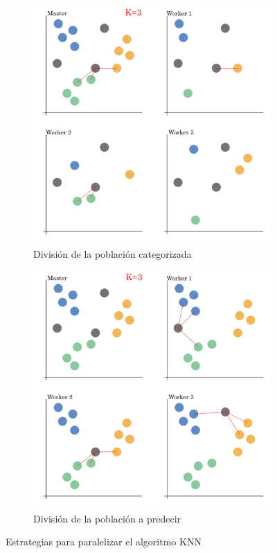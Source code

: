 		\begin{figure}[!h]
			\centering
			
			
			\begin{subfigure}[t]{0.45\textwidth}
				\centering
				\includegraphics[width=\textwidth]{images/chapter_3/knn_mpi1}
				\caption{División de la población categorizada}
				\label{fig:knn1}
			\end{subfigure}
			\hfill
			\begin{subfigure}[t]{0.45\textwidth}
				\centering
				\includegraphics[width=\textwidth]{images/chapter_3/knn_mpi2}
				\caption{División de la población a predecir}
				\label{fig:knn2}
			\end{subfigure}
			
			\caption{Estrategias para paralelizar el algoritmo KNN}
			\label{fig:knnmpi}
		\end{figure}

